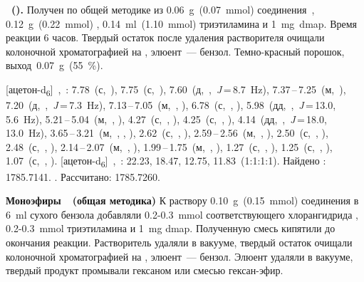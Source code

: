 \textbf{~().}
Получен по общей методике из \SI{0.06}{\gram}~(\SI{0.07}{\milli\mole}) соединения~, \SI{0.12}{\gram}~(\SI{0.22}{\milli\mole}) , \SI{0.14}{\milli\litre}~(\SI{1.10}{\milli\mole}) триэтиламина и \SI{1}{\milli\gram}~\ac{dmap}.
Время реакции 6 часов. Твердый остаток после удаления растворителя очищали колоночной хроматографией на , элюент~--- бензол.
Темно-красный порошок, выход~\SI{0.07}{\gram}~(\SI{55}{\percent}). 
\begin{experimental}
    [ацетон-d\textsubscript{6}]~\chemdelta,~\si{\ppm}: 7.78~(с,~), 7.75~(с,~), 7.60~(д,~,~\textit{J}\,=\,8.7~\si{\hertz}), 7.37\,--\,7.25~(м,~), 7.20~(д,~,~\textit{J}\,=\,7.3~\si{\hertz}), 7.13\,--\,7.05~(м,~, ), 6.78~(с,~, ), 5.98~(дд,~,~\textit{J}\,=\,13.0, 5.6~\si{\hertz}), 5.21\,--\,5.04~(м,~, ), 4.27~(с,~, ), 4.25~(с,~, ), 4.14~(дд,~,~\textit{J}\,=\,18.0, 13.0~\si{\hertz}), 3.65\,--\,3.21~(м,~, , ), 2.62~(с,~, ), 2.59\,--\,2.56~(м,~, ), 2.50~(с,~, ), 2.48~(с,~, ), 2.14\,--\,2.07~(м,~, ), 1.99\,--\,1.75~(м,~, ), 1.27~(с,~, ), 1.25~(с,~, ), 1.07~(с,~, ).
    [ацетон-d\textsubscript{6}]~\chemdelta,~\si{\ppm}: 22.23, 18.47, 12.75, 11.83~(1:1:1:1).
     Найдено \ce{[M + H]+}: \num{1785.7141}. . Рассчитано: \ce{[M + H]} \num{1785.7260}.
\end{experimental}

\textbf{Моноэфиры~~(общая методика)}
К раствору \SI{0.10}{\gram}~(\SI{0.15}{\milli\mole}) соединения  в \SI{6}{\milli\litre} сухого бензола добавляли 0.2-0.3~\si{\milli\mole} соответствующего хлорангидрида , 0.2-0.3~\si{\milli\mole} триэтиламина и \SI{1}{\milli\gram} \ac{dmap}.
Полученную смесь кипятили до окончания реакции.
Растворитель удаляли в вакууме, твердый остаток очищали колоночной хроматографией на , элюент~--- бензол.
Элюент удаляли в вакууме, твердый продукт промывали гексаном или смесью гексан-эфир.

